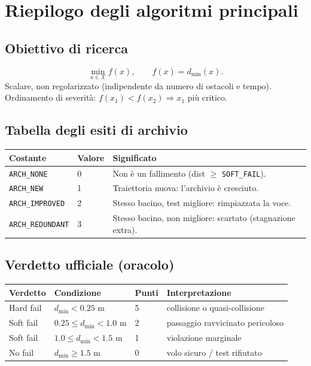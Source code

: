 \documentclass[11pt,a4paper]{report}
\newcommand{\code}[1]{\texttt{#1}}
\begin{document}
\chapter{Riepilogo degli algoritmi principali}

\section{Obiettivo di ricerca}
\[
\min_{x\in\mathcal{X}} f(x), \qquad f(x)=d_{\min}(x).
\]
Scalare, non regolarizzato (indipendente da numero di ostacoli e tempo).
Ordinamento di severità: $f(x_1)<f(x_2)\Rightarrow x_1$ più critico.

\section{Tabella degli esiti di archivio}
\begin{longtable}{L{3.4cm} L{2cm} L{8.6cm}}
\toprule
\textbf{Costante} & \textbf{Valore} & \textbf{Significato}\\
\midrule
\endhead
\code{ARCH\_NONE} & 0 & Non è un fallimento (dist $\ge$ \code{SOFT\_FAIL}).\\
\code{ARCH\_NEW} & 1 & Traiettoria nuova: l'archivio è cresciuto.\\
\code{ARCH\_IMPROVED} & 2 & Stesso bacino, test migliore: rimpiazzata la voce.\\
\code{ARCH\_REDUNDANT} & 3 & Stesso bacino, non migliore: scartato (stagnazione extra).\\
\bottomrule
\end{longtable}

\section{Verdetto ufficiale (oracolo)}
\begin{longtable}{L{2.6cm} L{4.2cm} L{2cm} L{4.4cm}}
\toprule
\textbf{Verdetto} & \textbf{Condizione} & \textbf{Punti} & \textbf{Interpretazione}\\
\midrule
\endhead
Hard fail & $d_{\min}<0.25$ m & 5 & collisione o quasi-collisione\\
Soft fail & $0.25\le d_{\min}<1.0$ m & 2 & passaggio ravvicinato pericoloso\\
Soft fail & $1.0\le d_{\min}<1.5$ m & 1 & violazione marginale\\
No fail & $d_{\min}\ge 1.5$ m & 0 & volo sicuro / test rifiutato\\
\bottomrule
\end{longtable}
\end{document}
